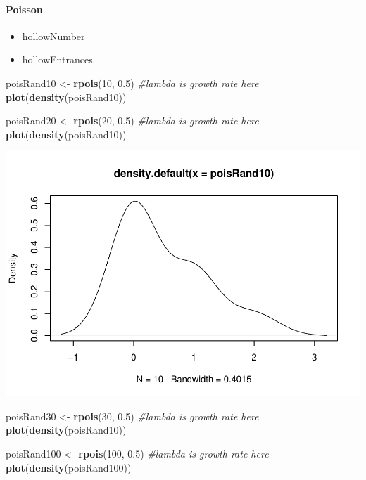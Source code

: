 \documentclass[utf8]{frontiersSCNS}
\providecommand{\tightlist}{%
  \setlength{\itemsep}{0pt}\setlength{\parskip}{0pt}}
\newenvironment{Shaded}{\begin{snugshade}}{\end{snugshade}}
\newcommand{\CommentTok}[1]{\textcolor[rgb]{0.56,0.35,0.01}{\textit{#1}}}
\newcommand{\DecValTok}[1]{\textcolor[rgb]{0.00,0.00,0.81}{#1}}
\newcommand{\FloatTok}[1]{\textcolor[rgb]{0.00,0.00,0.81}{#1}}
\newcommand{\KeywordTok}[1]{\textcolor[rgb]{0.13,0.29,0.53}{\textbf{#1}}}
\newcommand{\NormalTok}[1]{#1}
\newcommand{\StringTok}[1]{\textcolor[rgb]{0.31,0.60,0.02}{#1}}
\begin{document}
\hypertarget{poisson}{%
\paragraph{Poisson}\label{poisson}}

\begin{itemize}
\tightlist
\item
  hollowNumber
\item
  hollowEntrances
\end{itemize}

\begin{Shaded}
\begin{Highlighting}[]
\NormalTok{poisRand10 <-}\StringTok{ }\KeywordTok{rpois}\NormalTok{(}\DecValTok{10}\NormalTok{, }\FloatTok{0.5}\NormalTok{) }\CommentTok{#lambda is growth rate here}
\KeywordTok{plot}\NormalTok{(}\KeywordTok{density}\NormalTok{(poisRand10))}

\NormalTok{poisRand20 <-}\StringTok{ }\KeywordTok{rpois}\NormalTok{(}\DecValTok{20}\NormalTok{, }\FloatTok{0.5}\NormalTok{) }\CommentTok{#lambda is growth rate here}
\KeywordTok{plot}\NormalTok{(}\KeywordTok{density}\NormalTok{(poisRand10))}
\end{Highlighting}
\end{Shaded}

\includegraphics{demoReport_files/figure-latex/unnamed-chunk-6-1.pdf}

\begin{Shaded}
\begin{Highlighting}[]
\NormalTok{poisRand30 <-}\StringTok{ }\KeywordTok{rpois}\NormalTok{(}\DecValTok{30}\NormalTok{, }\FloatTok{0.5}\NormalTok{) }\CommentTok{#lambda is growth rate here}
\KeywordTok{plot}\NormalTok{(}\KeywordTok{density}\NormalTok{(poisRand10))}

\NormalTok{poisRand100 <-}\StringTok{ }\KeywordTok{rpois}\NormalTok{(}\DecValTok{100}\NormalTok{, }\FloatTok{0.5}\NormalTok{) }\CommentTok{#lambda is growth rate here}
\KeywordTok{plot}\NormalTok{(}\KeywordTok{density}\NormalTok{(poisRand100))}
\end{Highlighting}
\end{Shaded}
\end{document}
